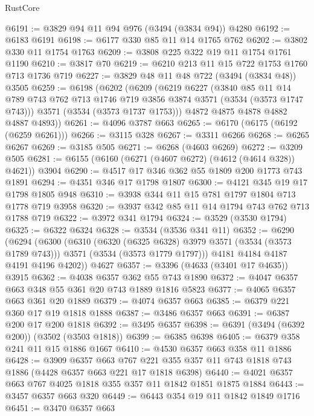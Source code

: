 \begin{lexlean}{RustCore}
\begin{coremodule}
@6191 := @3829 @94 @11 @94 @976 (@3494 (@3834 @94)) @4280
@6192 := @6183 @6191
@6198 := @6177 @330 @85 @11 @14 @1765 @762
@6202 := @3802 @330 @11 @1754 @1763
@6209 := @3808 @225 @322 @19 @11 @1754 @1761 @1190
@6210 := @3817 @70
@6219 := @6210 @213 @11 @15 @722 @1753 @1760 @713 @1736 @719
@6227 := @3829 @48 @11 @48 @722 (@3494 (@3834 @48)) @3505
@6259 := @6198
    (@6202
      (@6209
        (@6219
          @6227
          (@3840
            @85
            @11
            @14
            @789
            @743
            @762
            @713
            @1746
            @719
            @3856
            @3874
            @3571
            (@3534 (@3573 @1747 @743)))
          @3571
          (@3534 (@3573 @1737 @1753)))
        @4872
        @4875
        @4878
        @4882
        @4887
        @4893))
@6261 := @4096 @3787 @663
@6265 := @6170 (@6175 (@6192 (@6259 @6261)))
@6266 := @3115 @328
@6267 := @3311 @6266
@6268 := @6265 @6267
@6269 := @3185 @505
@6271 := @6268 (@4603 @6269)
@6272 := @3209 @505
@6281 := @6155 (@6160 (@6271 (@4607 @6272) (@4612 (@4614 @328)) @4621)) @3904
@6290 := @4517 @17 @346 @362 @55 @1809 @200 @1773 @743 @1891
@6294 := @4351 @346 @17 @1798 @1807
@6300 := @4121 @345 @19 @17 @1798 @1805 @948
@6310 := @3938 @344 @11 @15 @781 @1797 @1804 @713 @1778 @719 @3958
@6320 := @3937 @342 @85 @11 @14 @1794 @743 @762 @713 @1788 @719
@6322 := @3972 @341 @1794
@6324 := @3529 (@3530 @1794)
@6325 := @6322 @6324
@6328 := @3534 (@3536 @341 @11)
@6352 := @6290
    (@6294
      (@6300
        (@6310
          (@6320 (@6325 @6328) @3979 @3571 (@3534 (@3573 @1789 @743)))
          @3571
          (@3534 (@3573 @1779 @1797)))
        @4181
        @4184
        @4187
        @4191
        @4196
        @4202))
    @4627
@6357 := @3396 (@4633 (@3401 @17 @4635)) @3915
@6362 := @4038 @6357 @362 @55 @743 @1890
@6372 := @4047 @6357 @663 @348 @55 @361 @20 @743 @1889 @1816 @5823
@6377 := @4065 @6357 @663 @361 @20 @1889
@6379 := @4074 @6357 @663
@6385 := @6379 @221 @360 @17 @19 @1818 @1888
@6387 := @3486 @6357 @663
@6391 := @6387 @200 @17 @200 @1818
@6392 := @3495 @6357
@6398 := @6391 (@3494 (@6392 @200)) (@3502 (@3503 @1818))
@6399 := @6385 @6398
@6405 := @6379 @358 @241 @11 @15 @1886 @1667
@6410 := @4530 @6357 @663 @358 @11 @1886
@6428 := @3909
    @6357
    @663
    @767
    @221
    @355
    @357
    @11
    @743
    @1818
    @743
    @1886
    (@4428 @6357 @663 @221 @17 @1818 @6398)
@6440 := @4021 @6357 @663 @767 @4025 @1818 @355 @357 @11 @1842 @1851 @1875 @1884
@6443 := @3457 @6357 @663 @320
@6449 := @6443 @354 @19 @11 @1842 @1849 @1716
@6451 := @3470 @6357 @663

\end{coremodule}
\end{lexlean}
